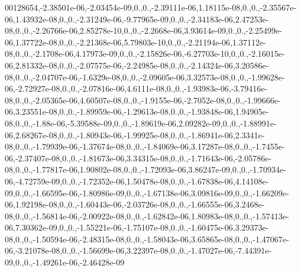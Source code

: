 {00128654,-\/2.\-38501e-\/06,-\/2.\-03454e-\/09,0.,0.,-\/2.\-39111e-\/06,1.\-18115e-\/08,0.,0.,-\/2.\-35567e-\/06,1.\-43932e-\/08,0.,0.,-\/2.\-31249e-\/06,-\/9.\-77965e-\/09,0.,0.,-\/2.\-34183e-\/06,2.\-47253e-\/08,0.,0.,-\/2.\-26766e-\/06,2.\-85278e-\/10,0.,0.,-\/2.\-2668e-\/06,3.\-93614e-\/09,0.,0.,-\/2.\-25499e-\/06,1.\-37722e-\/08,0.,0.,-\/2.\-21368e-\/06,5.\-79803e-\/10,0.,0.,-\/2.\-21194e-\/06,1.\-37112e-\/08,0.,0.,-\/2.\-1708e-\/06,4.\-17973e-\/09,0.,0.,-\/2.\-15826e-\/06,-\/6.\-27703e-\/10,0.,0.,-\/2.\-16015e-\/06,2.\-81332e-\/08,0.,0.,-\/2.\-07575e-\/06,-\/2.\-24985e-\/08,0.,0.,-\/2.\-14324e-\/06,3.\-20586e-\/08,0.,0.,-\/2.\-04707e-\/06,-\/1.\-6329e-\/08,0.,0.,-\/2.\-09605e-\/06,3.\-32573e-\/08,0.,0.,-\/1.\-99628e-\/06,-\/2.\-72927e-\/08,0.,0.,-\/2.\-07816e-\/06,4.\-6111e-\/08,0.,0.,-\/1.\-93983e-\/06,-\/3.\-79416e-\/08,0.,0.,-\/2.\-05365e-\/06,4.\-60507e-\/08,0.,0.,-\/1.\-9155e-\/06,-\/2.\-7052e-\/08,0.,0.,-\/1.\-99666e-\/06,3.\-23551e-\/08,0.,0.,-\/1.\-89959e-\/06,-\/1.\-29613e-\/08,0.,0.,-\/1.\-93848e-\/06,1.\-94905e-\/08,0.,0.,-\/1.\-88e-\/06,-\/5.\-39588e-\/09,0.,0.,-\/1.\-89619e-\/06,2.\-09282e-\/09,0.,0.,-\/1.\-88991e-\/06,2.\-68267e-\/08,0.,0.,-\/1.\-80943e-\/06,-\/1.\-99925e-\/08,0.,0.,-\/1.\-86941e-\/06,2.\-3341e-\/08,0.,0.,-\/1.\-79939e-\/06,-\/1.\-37674e-\/08,0.,0.,-\/1.\-84069e-\/06,3.\-17287e-\/08,0.,0.,-\/1.\-7455e-\/06,-\/2.\-37407e-\/08,0.,0.,-\/1.\-81673e-\/06,3.\-34315e-\/08,0.,0.,-\/1.\-71643e-\/06,-\/2.\-05786e-\/08,0.,0.,-\/1.\-77817e-\/06,1.\-90802e-\/08,0.,0.,-\/1.\-72093e-\/06,3.\-86247e-\/09,0.,0.,-\/1.\-70934e-\/06,-\/4.\-72759e-\/09,0.,0.,-\/1.\-72352e-\/06,1.\-50478e-\/08,0.,0.,-\/1.\-67838e-\/06,4.\-14108e-\/09,0.,0.,-\/1.\-66595e-\/06,-\/1.\-80986e-\/09,0.,0.,-\/1.\-67138e-\/06,3.\-09816e-\/09,0.,0.,-\/1.\-66209e-\/06,1.\-92198e-\/08,0.,0.,-\/1.\-60443e-\/06,-\/2.\-03726e-\/08,0.,0.,-\/1.\-66555e-\/06,3.\-2468e-\/08,0.,0.,-\/1.\-56814e-\/06,-\/2.\-00922e-\/08,0.,0.,-\/1.\-62842e-\/06,1.\-80983e-\/08,0.,0.,-\/1.\-57413e-\/06,7.\-30362e-\/09,0.,0.,-\/1.\-55221e-\/06,-\/1.\-75107e-\/08,0.,0.,-\/1.\-60475e-\/06,3.\-29373e-\/08,0.,0.,-\/1.\-50594e-\/06,-\/2.\-48315e-\/08,0.,0.,-\/1.\-58043e-\/06,3.\-65865e-\/08,0.,0.,-\/1.\-47067e-\/06,-\/3.\-21078e-\/08,0.,0.,-\/1.\-56699e-\/06,3.\-22397e-\/08,0.,0.,-\/1.\-47027e-\/06,-\/7.\-44391e-\/09,0.,0.,-\/1.\-49261e-\/06,-\/2.\-46428e-\/09}
